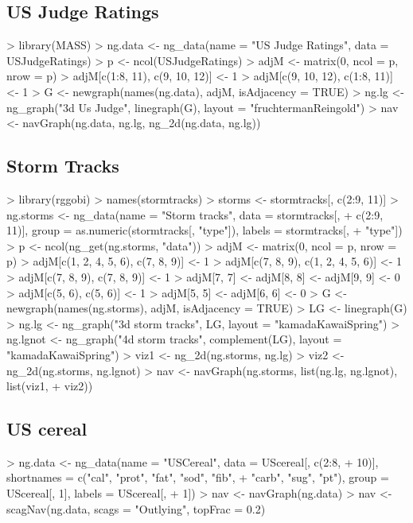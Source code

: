 \documentclass[12pt,oneside,titlepage,letter]{article}
\begin{document}
\subsection{US Judge Ratings}
\begin{Schunk}
\begin{Sinput}
> library(MASS)
> ng.data <- ng_data(name = "US Judge Ratings", data = USJudgeRatings)
> p <- ncol(USJudgeRatings)
> adjM <- matrix(0, ncol = p, nrow = p)
> adjM[c(1:8, 11), c(9, 10, 12)] <- 1
> adjM[c(9, 10, 12), c(1:8, 11)] <- 1
> G <- newgraph(names(ng.data), adjM, isAdjacency = TRUE)
> ng.lg <- ng_graph("3d Us Judge", linegraph(G), layout = "fruchtermanReingold")
> nav <- navGraph(ng.data, ng.lg, ng_2d(ng.data, ng.lg))
\end{Sinput}
\end{Schunk}


\subsection{Storm Tracks}
\begin{Schunk}
\begin{Sinput}
> library(rggobi)
> names(stormtracks)
> storms <- stormtracks[, c(2:9, 11)]
> ng.storms <- ng_data(name = "Storm tracks", data = stormtracks[, 
+     c(2:9, 11)], group = as.numeric(stormtracks[, "type"]), labels = stormtracks[, 
+     "type"])
> p <- ncol(ng_get(ng.storms, "data"))
> adjM <- matrix(0, ncol = p, nrow = p)
> adjM[c(1, 2, 4, 5, 6), c(7, 8, 9)] <- 1
> adjM[c(7, 8, 9), c(1, 2, 4, 5, 6)] <- 1
> adjM[c(7, 8, 9), c(7, 8, 9)] <- 1
> adjM[7, 7] <- adjM[8, 8] <- adjM[9, 9] <- 0
> adjM[c(5, 6), c(5, 6)] <- 1
> adjM[5, 5] <- adjM[6, 6] <- 0
> G <- newgraph(names(ng.storms), adjM, isAdjacency = TRUE)
> LG <- linegraph(G)
> ng.lg <- ng_graph("3d storm tracks", LG, layout = "kamadaKawaiSpring")
> ng.lgnot <- ng_graph("4d storm tracks", complement(LG), layout = "kamadaKawaiSpring")
> viz1 <- ng_2d(ng.storms, ng.lg)
> viz2 <- ng_2d(ng.storms, ng.lgnot)
> nav <- navGraph(ng.storms, list(ng.lg, ng.lgnot), list(viz1, 
+     viz2))
\end{Sinput}
\end{Schunk}


\subsection{US cereal}
\begin{Schunk}
\begin{Sinput}
> ng.data <- ng_data(name = "USCereal", data = UScereal[, c(2:8, 
+     10)], shortnames = c("cal", "prot", "fat", "sod", "fib", 
+     "carb", "sug", "pt"), group = UScereal[, 1], labels = UScereal[, 
+     1])
> nav <- navGraph(ng.data)
> nav <- scagNav(ng.data, scags = "Outlying", topFrac = 0.2)
\end{Sinput}
\end{Schunk}
\end{document}
